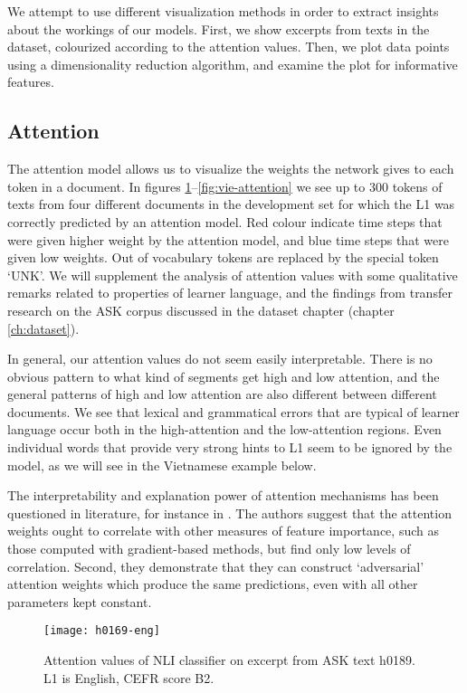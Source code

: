 We attempt to use different visualization methods in order to extract
insights about the workings of our models. First, we show excerpts from texts
in the dataset, colourized according to the attention values. Then, we plot
data points using a dimensionality reduction algorithm, and examine the plot
for informative features.


\subsection{Attention} \label{subsec:attentionvis}

The attention model allows us to visualize the weights the network gives to
each token in a document. In figures
\ref{fig:eng-attention}--\ref{fig:vie-attention} we see up to 300 tokens of
texts from four different documents in the development set for which the L1
was correctly predicted by an attention model. Red colour indicate time steps
that were given higher weight by the attention model, and blue time steps
that were given low weights. Out of vocabulary tokens are replaced by the
special token `UNK'. We will supplement the analysis of attention values with
some qualitative remarks related to properties of learner language, and the
findings from transfer research on the ASK corpus discussed in the dataset
chapter (chapter \ref{ch:dataset}).

In general, our attention values do not seem easily interpretable. There is
no obvious pattern to what kind of segments get high and low attention, and
the general patterns of high and low attention are also different between
different documents. We see that lexical and grammatical errors that are
typical of learner language occur both in the high-attention and the
low-attention regions. Even individual words that provide very strong hints
to \ac{L1} seem to be ignored by the model, as we will see in the Vietnamese
example below.

The interpretability and explanation power of attention mechanisms has been
questioned in literature, for instance in \textcite{attentionexplanation}.
The authors suggest that the attention weights ought to correlate with other
measures of feature importance, such as those computed with gradient-based
methods, but find only low levels of correlation. Second, they demonstrate
that they can construct `adversarial' attention weights which produce the
same predictions, even with all other parameters kept constant.

\begin{figure}
  \centering
  \texttt{[image: h0169-eng]}
  \caption[Attention heat map in a text by an English speaker]{
    Attention values of NLI classifier on excerpt from ASK text h0189. L1 is
    English, CEFR score B2.
  }
  \label{fig:eng-attention}
\end{figure}

